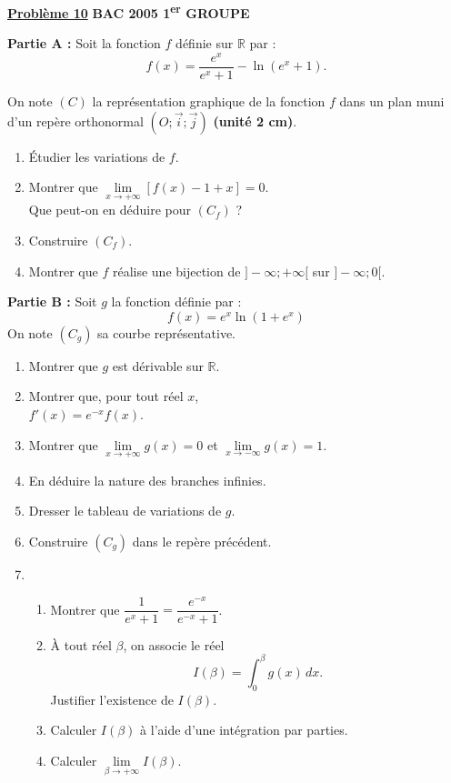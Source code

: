 \documentclass[12pt,a4paper]{article}
\newcommand{\exo}[1]{%
        \textbf{\underline{Problème #1}}
}
\begin{document}
\begin{multicols}{2}
\exo{10} \textbf{BAC 2005 1\textsuperscript{er} GROUPE}

\textbf{Partie A :} Soit la fonction \( f \) définie sur \( \mathbb{R} \) par :
\[
f(x) = \frac{e^x}{e^x + 1} - \ln(e^x + 1).
\]

On note \( (C) \) la représentation graphique de la fonction \( f \) dans un plan muni d’un repère orthonormal \( (O ; \vec{i} ; \vec{j}) \) \textbf{(unité 2 cm)}.

\begin{enumerate}
    \item Étudier les variations de \( f \).
    \item Montrer que \( \lim\limits_{x \to +\infty} \left[ f(x) - 1 + x \right] = 0 \).\\
    Que peut-on en déduire pour \( (C_f) \) ?
    \item Construire \( (C_f) \).
    \item Montrer que \( f \) réalise une bijection de \( ]-\infty ; +\infty[ \) sur \( ]-\infty ; 0[ \).
\end{enumerate}
\textbf{Partie B :} Soit \( g \) la fonction définie par :
\[
f(x) = e^x \ln(1 + e^x)
\]
On note \( (C_g) \) sa courbe représentative.

\begin{enumerate}
    \item Montrer que \( g \) est dérivable sur \( \mathbb{R} \).

    \item Montrer que, pour tout réel \( x \),\\
    \( f'(x) = e^{-x} f(x) \).

    \item Montrer que \( \lim\limits_{x \to +\infty} g(x) = 0 \) et \( \lim\limits_{x \to -\infty} g(x) = 1 \).

    \item En déduire la nature des branches infinies.

    \item Dresser le tableau de variations de \( g \).

    \item Construire \( (C_g) \) dans le repère précédent.
    
    \setcounter{enumi}{6}
    \item 
    \begin{enumerate}
        \item Montrer que \( \dfrac{1}{e^x + 1} = \dfrac{e^{-x}}{e^{-x} + 1} \).
        \item À tout réel \( \beta \), on associe le réel
        \[
        I(\beta) = \int_0^{\beta} g(x)\,dx.
        \]
        Justifier l’existence de \( I(\beta) \).
        \item Calculer \( I(\beta) \) à l’aide d’une intégration par parties.
        \item Calculer \( \lim\limits_{\beta \to +\infty} I(\beta) \).
    \end{enumerate}


\end{enumerate}
\end{multicols}
\end{document}
